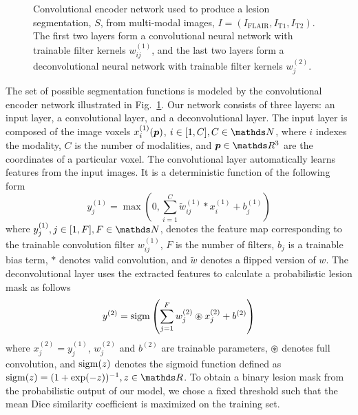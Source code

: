 \begin{figure}[tb]
\centering


\caption{Convolutional encoder network used to produce a lesion segmentation,
$S$, from multi-modal images, $I = (I_\text{FLAIR}, I_\text{T1}, I_\text{T2})$.
The first two layers form a convolutional neural network with trainable filter
kernels $w^{(1)}_{ij}$, and the last two layers form a deconvolutional neural
network with trainable filter kernels $w^{(2)}_j$.}

\label{fig:network}
\end{figure}

The set of possible segmentation functions is modeled by the convolutional
encoder network illustrated in Fig.~\ref{fig:network}. Our network consists of
three layers: an input layer, a convolutional layer, and a deconvolutional
layer. The input layer is composed of the image voxels $x^{(1)}_i(\vect{p})$, $i
\in [1, C], C \in \N$, where $i$ indexes the modality, $C$ is the number of
modalities, and $\vect{p} \in \R^3$ are the coordinates of a particular voxel.
The convolutional layer automatically learns features from the input images. It
is a deterministic function of the following form
\begin{equation}
y^{(1)}_j = \max \left(0, \sum_{i=1}^{C}\tilde{w}^{(1)}_{ij}*x^{(1)}_i +
b^{(1)}_j\right)
\end{equation}
where $y^{(1)}_j, j \in [1, F], F \in \N$, denotes the feature map corresponding
to the trainable convolution filter $w^{(1)}_{ij}$, $F$ is the number of
filters, $b_j$ is a trainable bias term, $*$ denotes valid convolution, and
$\tilde{w}$ denotes a flipped version of $w$. The deconvolutional layer uses the
extracted features to calculate a probabilistic lesion mask as follows
\begin{equation}
y^{(2)} = \operatorname{sigm}\left(\sum_{j=1}^Fw^{(2)}_{j}\circledast x^{(2)}_j +
b^{(2)}\right)
\end{equation}
where $x^{(2)}_j = y^{(1)}_j$, $w^{(2)}_j$ and $b^{(2)}$ are trainable
parameters, $\circledast$ denotes full convolution, and $\operatorname{sigm}(z)$ denotes the
sigmoid function defined as $\sigm(z) = (1 + \exp(-z))^{-1}, z \in \R$. To
obtain a binary lesion mask from the probabilistic output of our model, we chose
a fixed threshold such that the mean Dice similarity coefficient is
maximized on the training set.

